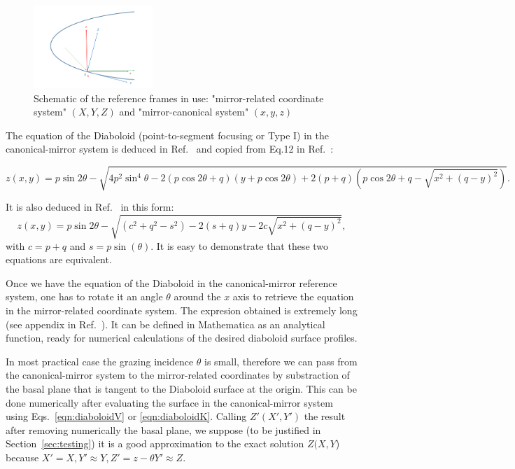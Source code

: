 \documentclass[a4paper, 11pt]{article}
\begin{document}
\begin{figure}[h]
\centering
\includegraphics[width=0.4\textwidth]{figures/diaboloid_frame.png}
\caption{\label{fig:frame}Schematic of the reference frames in use: "mirror-related coordinate system" $(X,Y,Z)$ and "mirror-canonical system" $(x,y,z)$}
\end{figure}

The equation of the Diaboloid (point-to-segment focusing or Type I) in the canonical-mirror system is deduced in Ref.~\cite{Valeriy2020a} and copied from Eq.12 in Ref.~\cite{Valeriy2020b}:

\begin{equation}
\label{eqn:diaboloidV}
z(x,y) = p \sin2\theta- \sqrt{ 4 p^2 \sin^4\theta - 2 (p \cos2\theta+q) (y + p  \cos2\theta) + 2 (p+q) (p \cos2\theta + q - \sqrt{x^2 + (q-y)^2}) }.
\end{equation}


It is also deduced in Ref.~\cite{Goldberg2020} in this form:
\begin{equation}
\label{eqn:diaboloidK}
z(x,y) = p \sin2\theta - \sqrt{(c^2 + q^2 - s^2) - 2 (s  + q) y - 2 c \sqrt{x^2 + (q-y)^2}},
\end{equation}
with $c=p+q$ and $s=p\sin(\theta)$. It is easy to demonstrate that these two equations are equivalent.

Once we have the equation of the Diaboloid in the canonical-mirror reference system, one has to rotate it an angle $\theta$ around the $x$ axis to retrieve the equation in the mirror-related coordinate system. The expresion obtained is extremely long (see appendix in Ref.~\cite{Valeriy2020b}). It can be defined in Mathematica as an analytical function, ready for numerical calculations of the desired diaboloid surface profiles.

In most practical case the grazing incidence $\theta$ is small, therefore we can pass from the canonical-mirror system to the mirror-related coordinates by substraction of the basal plane that is tangent to the Diaboloid surface at the origin. This can be done numerically after evaluating the surface in the canonical-mirror system using Eqs.~\ref{eqn:diaboloidV} or \ref{eqn:diaboloidK}. Calling $Z'(X',Y')$ the result after removing numerically the basal plane, we suppose (to be justified in Section~\ref{sec:testing}) it is a good approximation to the exact solution $Z(X,Y$) because $X'=X, Y'\approx Y, Z'=z - \theta Y' \approx Z$. 
\end{document}
